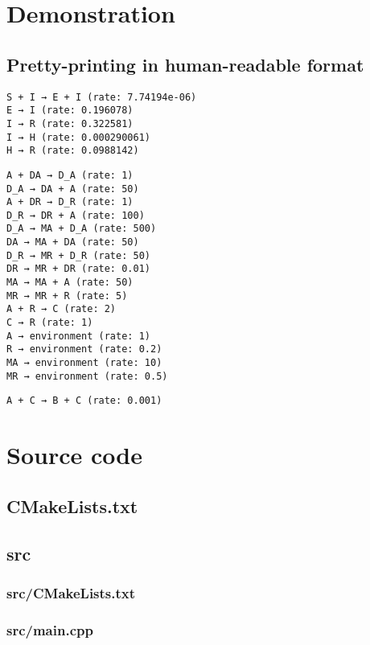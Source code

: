\section{Demonstration}
\subsection{Pretty-printing in human-readable format}
\begin{verbatim}
S + I → E + I (rate: 7.74194e-06)
E → I (rate: 0.196078)
I → R (rate: 0.322581)
I → H (rate: 0.000290061)
H → R (rate: 0.0988142)
\end{verbatim}
\begin{verbatim}
A + DA → D_A (rate: 1)
D_A → DA + A (rate: 50)
A + DR → D_R (rate: 1)
D_R → DR + A (rate: 100)
D_A → MA + D_A (rate: 500)
DA → MA + DA (rate: 50)
D_R → MR + D_R (rate: 50)
DR → MR + DR (rate: 0.01)
MA → MA + A (rate: 50)
MR → MR + R (rate: 5)
A + R → C (rate: 2)
C → R (rate: 1)
A → environment (rate: 1)
R → environment (rate: 0.2)
MA → environment (rate: 10)
MR → environment (rate: 0.5)
\end{verbatim}
\begin{verbatim}
A + C → B + C (rate: 0.001)
\end{verbatim}


\section{Source code}
\subsection{CMakeLists.txt}


\newpage
\subsection{src}
\subsubsection{src/CMakeLists.txt}

\newpage
\subsubsection{src/main.cpp}

\newpage
